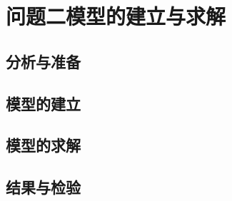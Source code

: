 \section{问题二模型的建立与求解}

\subsection{分析与准备}

\subsection{模型的建立}

\subsection{模型的求解}

\subsection{结果与检验}
